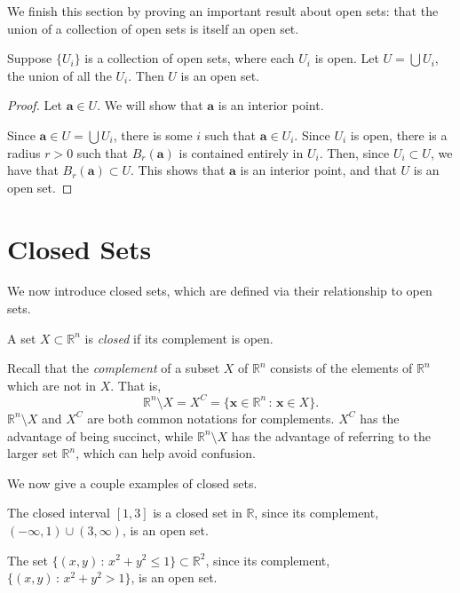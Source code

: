 \documentclass{ximera}
\begin{document}
We finish this section by proving an important result about open sets: that the union of a collection of open sets is itself an open set.

\begin{theorem}
Suppose $\{U_i\}$ is a collection of open sets, where each $U_i$ is open. Let $U=\bigcup U_i$, the union of all the $U_i$. Then $U$ is an open set.
\end{theorem}

\begin{proof}
Let $\mathbf{a}\in U$. We will show that $\mathbf{a}$ is an interior point.

Since $\mathbf{a}\in U=\bigcup U_i$, there is some $i$ such that $\mathbf{a}\in U_i$. Since $U_i$ is open, there is a radius $r>0$ such that $B_r(\mathbf{a})$ is contained entirely in $U_i$. Then, since $U_i \subset U$, we have that $B_r(\mathbf{a})\subset U$. This shows that $\mathbf{a}$ is an interior point, and that $U$ is an open set.

\end{proof}

\section{Closed Sets}

We now introduce closed sets, which are defined via their relationship to open sets.

\begin{definition}
A set $X\subset \mathbb{R}^n$ is \emph{closed} if its complement is open.
\end{definition}

Recall that the \emph{complement} of a subset $X$ of $\mathbb{R}^n$ consists of the elements of $\mathbb{R}^n$ which are not in $X$. That is,
\[
\mathbb{R}^n\setminus X = X^C = \{\mathbf{x}\in\mathbb{R}^n\,:\,\mathbf{x}\in X\}.
\]
$\mathbb{R}^n\setminus X$ and $X^C$ are both common notations for complements. $X^C$ has the advantage of being succinct, while $\mathbb{R}^n\setminus X$ has the advantage of referring to the larger set $\mathbb{R}^n$, which can help avoid confusion.

We now give a couple examples of closed sets.

\begin{example}

The closed interval $[1,3]$ is a closed set in $\mathbb{R}$, since its complement, $(-\infty, 1)\cup (3,\infty)$, is an open set.

The set $\{(x,y)\,:\,x^2+y^2\leq 1\}\subset \mathbb{R}^2$, since its complement, $\{(x,y)\,:\,x^2+y^2> 1\}$, is an open set.

\end{example}
\end{document}
